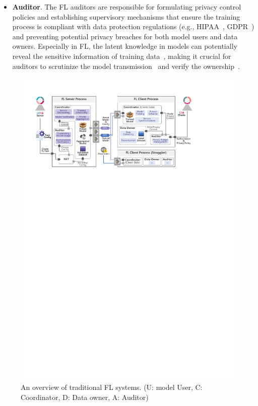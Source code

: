 \begin{itemize}
    \item \textbf{Auditor}. The FL auditors are responsible for formulating privacy control policies and establishing supervisory mechanisms that ensure the training process is compliant with data protection regulations (e.g., HIPAA~\cite{act1996health}, GDPR~\cite{voigt2017eu}) and preventing potential privacy breaches for both model users and data owners. Especially in FL, the latent knowledge in models can potentially reveal the sensitive information of training data~\cite{wang2019beyond, zhu2019deep, jin2021cafe}, making it crucial for auditors to scrutinize the model transmission~\cite{wei2021gradient, li2022auditing} and verify the ownership~\cite{tekgul2021waffle, shao2022fedtracker}.
\end{itemize}

\begin{figure}[t]
    \centering
    \includegraphics[width=\linewidth]{fig/fl_frame.pdf} %
    \caption{An overview of traditional FL systems. (U: model User, C: Coordinator, D: Data owner, A: Auditor)}
    \vspace{-5mm}
    \label{fig:fl}
  \end{figure}

